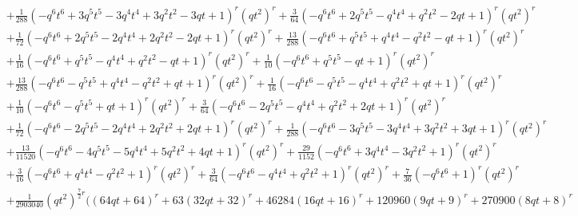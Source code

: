 \documentclass[11pt,english]{amsart}
\numberwithin{equation}{section}
\numberwithin{figure}{section}
\theoremstyle{plain}
\theoremstyle{plain}
\theoremstyle{definition}
\theoremstyle{remark}
\begin{document}
{\begin{align*}
& + \frac{1}{288}  {\left(-q^{6} t^{6} + 3  q^{5} t^{5} - 3  q^{4} t^{4} + 3  q^{2} t^{2} - 3  q t + 1\right)}^{r} \left(q t^{2}\right)^{r} + \frac{3}{64}  {\left(-q^{6} t^{6} + 2  q^{5} t^{5} - q^{4} t^{4} + q^{2} t^{2} - 2  q t + 1\right)}^{r} \left(q t^{2}\right)^{r} \\
& + \frac{1}{72}  {\left(-q^{6} t^{6} + 2  q^{5} t^{5} - 2  q^{4} t^{4} + 2  q^{2} t^{2} - 2  q t + 1\right)}^{r} \left(q t^{2}\right)^{r} + \frac{13}{288}  {\left(-q^{6} t^{6} + q^{5} t^{5} + q^{4} t^{4} - q^{2} t^{2} - q t + 1\right)}^{r} \left(q t^{2}\right)^{r} \\
& + \frac{1}{16}  {\left(-q^{6} t^{6} + q^{5} t^{5} - q^{4} t^{4} + q^{2} t^{2} - q t + 1\right)}^{r} \left(q t^{2}\right)^{r} + \frac{1}{10}  {\left(-q^{6} t^{6} + q^{5} t^{5} - q t + 1\right)}^{r} \left(q t^{2}\right)^{r} \\
& + \frac{13}{288}  {\left(-q^{6} t^{6} - q^{5} t^{5} + q^{4} t^{4} - q^{2} t^{2} + q t + 1\right)}^{r} \left(q t^{2}\right)^{r} + \frac{1}{16}  {\left(-q^{6} t^{6} - q^{5} t^{5} - q^{4} t^{4} + q^{2} t^{2} + q t + 1\right)}^{r} \left(q t^{2}\right)^{r} \\
& + \frac{1}{10}  {\left(-q^{6} t^{6} - q^{5} t^{5} + q t + 1\right)}^{r} \left(q t^{2}\right)^{r} + \frac{3}{64}  {\left(-q^{6} t^{6} - 2  q^{5} t^{5} - q^{4} t^{4} + q^{2} t^{2} + 2  q t + 1\right)}^{r} \left(q t^{2}\right)^{r} \\
& + \frac{1}{72}  {\left(-q^{6} t^{6} - 2  q^{5} t^{5} - 2  q^{4} t^{4} + 2  q^{2} t^{2} + 2  q t + 1\right)}^{r} \left(q t^{2}\right)^{r} + \frac{1}{288}  {\left(-q^{6} t^{6} - 3  q^{5} t^{5} - 3  q^{4} t^{4} + 3  q^{2} t^{2} + 3  q t + 1\right)}^{r} \left(q t^{2}\right)^{r} \\
& + \frac{13}{11520}  {\left(-q^{6} t^{6} - 4  q^{5} t^{5} - 5  q^{4} t^{4} + 5  q^{2} t^{2} + 4  q t + 1\right)}^{r} \left(q t^{2}\right)^{r} + \frac{29}{1152}  {\left(-q^{6} t^{6} + 3  q^{4} t^{4} - 3  q^{2} t^{2} + 1\right)}^{r} \left(q t^{2}\right)^{r} \\
& + \frac{3}{16}  {\left(-q^{6} t^{6} + q^{4} t^{4} - q^{2} t^{2} + 1\right)}^{r} \left(q t^{2}\right)^{r} + \frac{3}{64}  {\left(-q^{6} t^{6} - q^{4} t^{4} + q^{2} t^{2} + 1\right)}^{r} \left(q t^{2}\right)^{r} + \frac{7}{36}  {\left(-q^{6} t^{6} + 1\right)}^{r} \left(q t^{2}\right)^{r} \\
& + \frac{1}{2903040}  \left(q t^{2}\right)^{\frac{7}{2}  r} \Biggl({\left(64  q t + 64\right)}^{r} + 63  {\left(32  q t + 32\right)}^{r} + 46284  {\left(16  q t + 16\right)}^{r} + 120960  {\left(9  q t + 9\right)}^{r} + 270900  {\left(8  q t + 8\right)}^{r} \\

\end{align*}}
\end{document}
